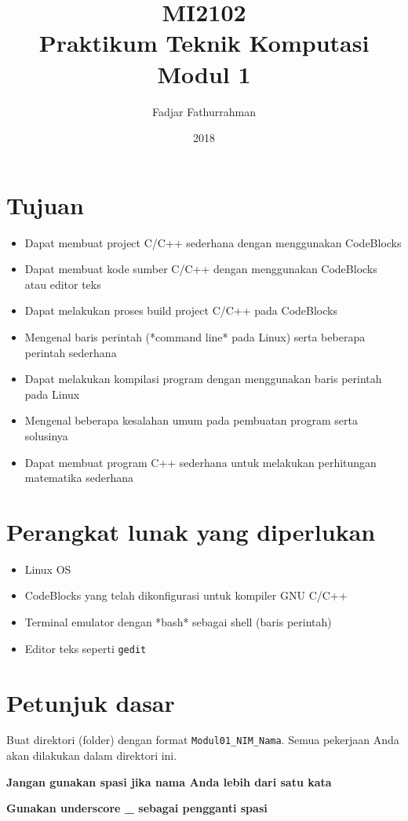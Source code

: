 \documentclass[a4paper,11pt]{extarticle}
\title{
MI2102\\
Praktikum Teknik Komputasi\\
Modul 1}
\author{Fadjar Fathurrahman}
\date{2018}
\begin{document}
\maketitle

\section{Tujuan}
\begin{itemize}
\item Dapat membuat project C/C++ sederhana dengan menggunakan CodeBlocks
\item Dapat membuat kode sumber C/C++ dengan menggunakan CodeBlocks
  atau editor teks
\item Dapat melakukan proses build project C/C++ pada CodeBlocks
\item Mengenal baris perintah (*command line* pada Linux) serta beberapa perintah sederhana
\item Dapat melakukan kompilasi program dengan menggunakan baris perintah pada Linux
\item Mengenal beberapa kesalahan umum pada pembuatan program serta solusinya
\item Dapat membuat program C++ sederhana untuk melakukan perhitungan matematika
sederhana
\end{itemize}

\section{Perangkat lunak yang diperlukan}
\begin{itemize}
\item Linux OS
\item CodeBlocks yang telah dikonfigurasi untuk kompiler GNU C/C++
\item Terminal emulator dengan *bash* sebagai shell (baris perintah)
\item Editor teks seperti \texttt{gedit}
\end{itemize}


\section{Petunjuk dasar}

Buat direktori (folder) dengan format \texttt{Modul01\_NIM\_Nama}. Semua
pekerjaan Anda akan dilakukan dalam direktori ini.

\textbf{Jangan gunakan spasi jika nama Anda lebih dari satu kata}

\textbf{Gunakan underscore \_ sebagai pengganti spasi}
\end{document}

